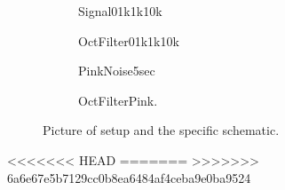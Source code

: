 \begin{figure}[H]
	\centering
	\begin{subfigure}[b]{0.45\textwidth}
		\centering
			
		\caption{Signal01k1k10k}
		\label{fig:Signal01k1k10k}
	\end{subfigure}
	\hfill
	\begin{subfigure}[b]{0.45\textwidth}
		\centering
			
		\caption{OctFilter01k1k10k}
		\label{fig:OctFilter01k1k10k}
	\end{subfigure}	
	\begin{subfigure}[b]{0.45\textwidth}
		\centering
			
		\caption{PinkNoise5sec}
		\label{fig:PinkNoise5sec}
	\end{subfigure}	
	\hfill
	\begin{subfigure}[b]{0.45\textwidth}
		\centering
		
		\caption{OctFilterPink.}
		\label{fig:OctFilterPink}
	\end{subfigure}	

	\caption{Picture of setup and the specific schematic.}
\end{figure}




<<<<<<< HEAD
=======
>>>>>>> 6a6e67e5b7129cc0b8ea6484af4ceba9e0ba9524
